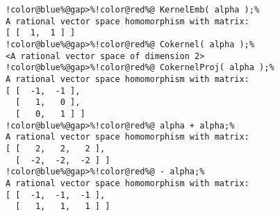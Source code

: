 \begin{Verbatim}[commandchars=!@\%,frame=single]
!color@blue%@gap>%!color@red%@ KernelEmb( alpha );%
A rational vector space homomorphism with matrix:
[ [  1,  1 ] ]
!color@blue%@gap>%!color@red%@ Cokernel( alpha );%
<A rational vector space of dimension 2>
!color@blue%@gap>%!color@red%@ CokernelProj( alpha );%
A rational vector space homomorphism with matrix: 
[ [  -1,  -1 ],
  [   1,   0 ],
  [   0,   1 ] ]
!color@blue%@gap>%!color@red%@ alpha + alpha;%
A rational vector space homomorphism with matrix: 
[ [   2,   2,   2 ],
  [  -2,  -2,  -2 ] ]
!color@blue%@gap>%!color@red%@ - alpha;%
A rational vector space homomorphism with matrix: 
[ [  -1,  -1,  -1 ],
  [   1,   1,   1 ] ]
\end{Verbatim}

